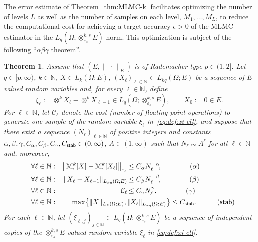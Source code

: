 \documentclass[reqno]{amsart}
\numberwithin{equation}{section}
\newcommand{\bbM}{\mathbb{M}}
\newcommand{\bbN}{\mathbb{N}}
\newcommand{\cC}{\mathcal{C}}
\newcommand{\xk}{\otimes^k}
\newcommand{\xkseps}{\otimes^{k,s}_{\varepsilon_s}}
\newcommand{\Mk}{\bbM^k_\varepsilon}
\newcommand{\norm}[2]{     \| #1       \|_{ #2 }}
\newcommand{\eps}{\varepsilon}
\newcommand{\Cstab}{C_{\sf stab}}
\newtheorem{theorem}[lemma]{Theorem}
\theoremstyle{remark}
\theoremstyle{definition}
\begin{document}
The error estimate of Theorem~\ref{thm:MLMC-k} 
facilitates optimizing the number 
of levels $L$ as well as 
the number of samples on each level, 
$M_1,\ldots, M_L$, 
to reduce the computational cost 
for achieving a target accuracy $\epsilon>0$ 
of the MLMC estimator in the 
$L_q(\Omega;\xkseps E)$-norm. 
This optimization is subject of the 
following ``$\alpha\beta\gamma$ theorem''.

\begin{theorem}\label{thm:alpha-beta-gamma}
	Assume that  
	$(E,\norm{\,\cdot\,}{E})$ 
	is of Rademacher type $p\in(1,2]$. 
	Let $q\in[p,\infty)$, 
	$k\in\bbN$, 
	$X \in L_k(\Omega; E)$,  
	$( X_\ell )_{\ell\in\bbN} \subset L_{kq}(\Omega;E)$ 
	be a sequence of 
	$E$-valued random variables 
	and, for every $\ell\in\bbN$, define   
	\begin{equation}\label{eq:def:xi-ell} 
	\xi_\ell 
	:= 
	\xk X_\ell - \xk X_{\ell-1} \in L_q ( \Omega; \xkseps E ), 
	\qquad 
	X_0 := 0\in E. 
	\end{equation}
	For $\ell\in\bbN$, 
	let $\cC_\ell$ denote the cost 
	(number of floating point operations)
	to generate one sample of 
	the random variable $\xi_\ell$ 
	in~\eqref{eq:def:xi-ell}, 
	and suppose 
	that there exist 
	a sequence $(N_\ell)_{\ell\in\bbN}$
	of positive integers 
	and constants 
	${\alpha,\beta,\gamma,C_\alpha,C_\beta,C_\gamma,\Cstab\in(0,\infty)}$, 
	$A\in(1,\infty)$ such that  
	$N_\ell \eqsim A^\ell$ 
	for all $\ell\in\bbN$ and, moreover, 
	\begin{align} 
	\quad 
	\forall \ell\in\bbN : 
	&&
	\bigl\| \Mk[X] - \Mk[X_\ell] \bigr\|_{\eps_s}  
	&\leq 
	C_\alpha N_\ell^{-\alpha} \!,
	\qquad
	\tag{$\alpha$} 
	\label{eq:ass:alpha} 
	\\
	\quad
	\forall \ell\in\bbN : 
	&&
	\| X_\ell - X_{\ell-1} \|_{L_{kq}(\Omega;E)} 
	&\leq 
	C_\beta N_\ell^{-\beta} \!, 
	\qquad 
	\tag{$\beta$} 
	\label{eq:ass:beta} 
	\\
	\quad
	\forall \ell\in\bbN : 
	&&
	\cC_\ell 
	&\leq 
	C_\gamma N_\ell^\gamma , 
	\qquad 
	\tag{$\gamma$} 
	\label{eq:ass:gamma} 
	\\
	\quad 
	\forall \ell\in\bbN : 
	&&
	\max\bigl\{ 
	\norm{X}{L_k(\Omega;E)} , \, 
	&\norm{X_\ell}{L_{kq}(\Omega;E)} 
	\bigr\}
	\leq 
	\Cstab. 
	\quad
	\tag{$\sf stab$} 
	\label{eq:ass:stab}  
	\end{align} 
	For each $\ell\in\bbN$, 
	let $( \xi_{\ell,j} )_{j\in\bbN} \subset L_q ( \Omega; \xkseps E )$ 
	be a sequence of independent 
	copies of 
	the $\xkseps E$-valued random variable 
	$\xi_\ell$ in \eqref{eq:def:xi-ell}. 
	

\end{theorem}
\end{document}

